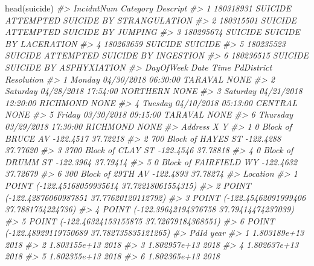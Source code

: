 \documentclass[
]{krantz}
\makeatletter
\newenvironment{Shaded}{\begin{snugshade}}{\end{snugshade}}
\newcommand{\CommentTok}[1]{\textcolor[rgb]{0.37,0.37,0.37}{\textit{#1}}}
\newcommand{\FunctionTok}[1]{\textcolor[rgb]{0,0,0}{#1}}
\newcommand{\NormalTok}[1]{#1}
\newenvironment{kframe}{%
\medskip{}
\setlength{\fboxsep}{.8em}
 \def\at@end@of@kframe{}%
 \ifinner\ifhmode%
  \def\at@end@of@kframe{\end{minipage}}%
  \begin{minipage}{\columnwidth}%
 \fi\fi%
 \def\FrameCommand##1{\hskip\@totalleftmargin \hskip-\fboxsep
 \colorbox{shadecolor}{##1}\hskip-\fboxsep
     \hskip-\linewidth \hskip-\@totalleftmargin \hskip\columnwidth}%
 \MakeFramed {\advance\hsize-\width
   \@totalleftmargin\z@ \linewidth\hsize
   \@setminipage}}%
 {\par\unskip\endMakeFramed%
 \at@end@of@kframe}
\renewenvironment{Shaded}{\begin{kframe}}{\end{kframe}}
\makeatother
\begin{document}
\begin{Shaded}
\begin{Highlighting}[]
\FunctionTok{head}\NormalTok{(suicide)}
\CommentTok{\#\textgreater{}   IncidntNum Category                           Descript}
\CommentTok{\#\textgreater{} 1  180318931  SUICIDE ATTEMPTED SUICIDE BY STRANGULATION}
\CommentTok{\#\textgreater{} 2  180315501  SUICIDE       ATTEMPTED SUICIDE BY JUMPING}
\CommentTok{\#\textgreater{} 3  180295674  SUICIDE              SUICIDE BY LACERATION}
\CommentTok{\#\textgreater{} 4  180263659  SUICIDE                            SUICIDE}
\CommentTok{\#\textgreater{} 5  180235523  SUICIDE     ATTEMPTED SUICIDE BY INGESTION}
\CommentTok{\#\textgreater{} 6  180236515  SUICIDE            SUICIDE BY ASPHYXIATION}
\CommentTok{\#\textgreater{}   DayOfWeek       Date     Time PdDistrict Resolution}
\CommentTok{\#\textgreater{} 1    Monday 04/30/2018 06:30:00    TARAVAL       NONE}
\CommentTok{\#\textgreater{} 2  Saturday 04/28/2018 17:54:00   NORTHERN       NONE}
\CommentTok{\#\textgreater{} 3  Saturday 04/21/2018 12:20:00   RICHMOND       NONE}
\CommentTok{\#\textgreater{} 4   Tuesday 04/10/2018 05:13:00    CENTRAL       NONE}
\CommentTok{\#\textgreater{} 5    Friday 03/30/2018 09:15:00    TARAVAL       NONE}
\CommentTok{\#\textgreater{} 6  Thursday 03/29/2018 17:30:00   RICHMOND       NONE}
\CommentTok{\#\textgreater{}                   Address         X        Y}
\CommentTok{\#\textgreater{} 1     0 Block of BRUCE AV {-}122.4517 37.72218}
\CommentTok{\#\textgreater{} 2   700 Block of HAYES ST {-}122.4288 37.77620}
\CommentTok{\#\textgreater{} 3   3700 Block of CLAY ST {-}122.4546 37.78818}
\CommentTok{\#\textgreater{} 4     0 Block of DRUMM ST {-}122.3964 37.79414}
\CommentTok{\#\textgreater{} 5 0 Block of FAIRFIELD WY {-}122.4632 37.72679}
\CommentTok{\#\textgreater{} 6    300 Block of 29TH AV {-}122.4893 37.78274}
\CommentTok{\#\textgreater{}                                         Location}
\CommentTok{\#\textgreater{} 1  POINT ({-}122.45168059935614 37.72218061554315)}
\CommentTok{\#\textgreater{} 2  POINT ({-}122.42876060987851 37.77620120112792)}
\CommentTok{\#\textgreater{} 3   POINT ({-}122.45462091999406 37.7881754224736)}
\CommentTok{\#\textgreater{} 4  POINT ({-}122.39642194376758 37.79414474237039)}
\CommentTok{\#\textgreater{} 5  POINT ({-}122.46324153155875 37.72679184368551)}
\CommentTok{\#\textgreater{} 6 POINT ({-}122.48929119750689 37.782735835121265)}
\CommentTok{\#\textgreater{}           PdId year}
\CommentTok{\#\textgreater{} 1 1.803189e+13 2018}
\CommentTok{\#\textgreater{} 2 1.803155e+13 2018}
\CommentTok{\#\textgreater{} 3 1.802957e+13 2018}
\CommentTok{\#\textgreater{} 4 1.802637e+13 2018}
\CommentTok{\#\textgreater{} 5 1.802355e+13 2018}
\CommentTok{\#\textgreater{} 6 1.802365e+13 2018}
\end{Highlighting}
\end{Shaded}
\end{document}

